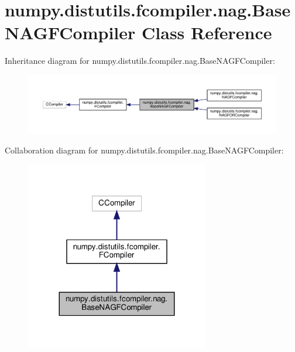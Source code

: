 \hypertarget{classnumpy_1_1distutils_1_1fcompiler_1_1nag_1_1BaseNAGFCompiler}{}\section{numpy.\+distutils.\+fcompiler.\+nag.\+Base\+N\+A\+G\+F\+Compiler Class Reference}
\label{classnumpy_1_1distutils_1_1fcompiler_1_1nag_1_1BaseNAGFCompiler}


Inheritance diagram for numpy.\+distutils.\+fcompiler.\+nag.\+Base\+N\+A\+G\+F\+Compiler\+:
\nopagebreak
\begin{figure}[H]
\begin{center}
\leavevmode
\includegraphics[width=350pt]{classnumpy_1_1distutils_1_1fcompiler_1_1nag_1_1BaseNAGFCompiler__inherit__graph}
\end{center}
\end{figure}


Collaboration diagram for numpy.\+distutils.\+fcompiler.\+nag.\+Base\+N\+A\+G\+F\+Compiler\+:
\nopagebreak
\begin{figure}[H]
\begin{center}
\leavevmode
\includegraphics[width=227pt]{classnumpy_1_1distutils_1_1fcompiler_1_1nag_1_1BaseNAGFCompiler__coll__graph}
\end{center}
\end{figure}
